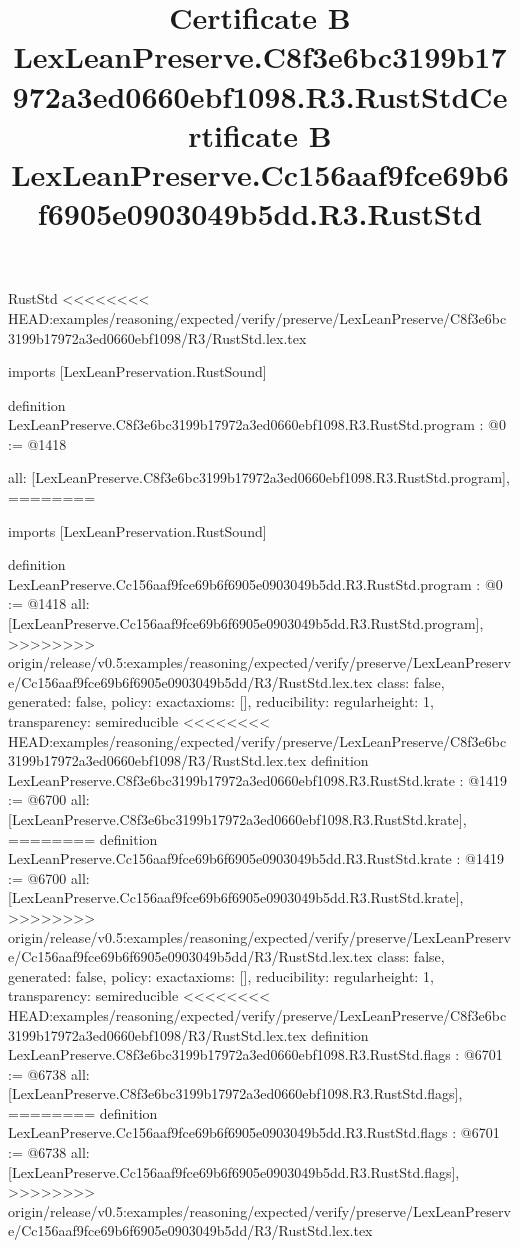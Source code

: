\begin{lexlean}{RustStd}
<<<<<<<< HEAD:examples/reasoning/expected/verify/preserve/LexLeanPreserve/C8f3e6bc3199b17972a3ed0660ebf1098/R3/RustStd.lex.tex
\title{Certificate B LexLeanPreserve.C8f3e6bc3199b17972a3ed0660ebf1098.R3.RustStd}
\begin{coremodule}
imports [LexLeanPreservation.RustSound]

definition LexLeanPreserve.C8f3e6bc3199b17972a3ed0660ebf1098.R3.RustStd.program : @0 := @1418 {
  all: [LexLeanPreserve.C8f3e6bc3199b17972a3ed0660ebf1098.R3.RustStd.program],
========
\title{Certificate B LexLeanPreserve.Cc156aaf9fce69b6f6905e0903049b5dd.R3.RustStd}
\begin{coremodule}
imports [LexLeanPreservation.RustSound]

definition LexLeanPreserve.Cc156aaf9fce69b6f6905e0903049b5dd.R3.RustStd.program : @0 := @1418 {
  all: [LexLeanPreserve.Cc156aaf9fce69b6f6905e0903049b5dd.R3.RustStd.program],
>>>>>>>> origin/release/v0.5:examples/reasoning/expected/verify/preserve/LexLeanPreserve/Cc156aaf9fce69b6f6905e0903049b5dd/R3/RustStd.lex.tex
  class: false,
  generated: false,
  policy: exact{axioms: []},
  reducibility: regular{height: 1},
  transparency: semireducible
}
<<<<<<<< HEAD:examples/reasoning/expected/verify/preserve/LexLeanPreserve/C8f3e6bc3199b17972a3ed0660ebf1098/R3/RustStd.lex.tex
definition LexLeanPreserve.C8f3e6bc3199b17972a3ed0660ebf1098.R3.RustStd.krate : @1419 := @6700 {
  all: [LexLeanPreserve.C8f3e6bc3199b17972a3ed0660ebf1098.R3.RustStd.krate],
========
definition LexLeanPreserve.Cc156aaf9fce69b6f6905e0903049b5dd.R3.RustStd.krate : @1419 := @6700 {
  all: [LexLeanPreserve.Cc156aaf9fce69b6f6905e0903049b5dd.R3.RustStd.krate],
>>>>>>>> origin/release/v0.5:examples/reasoning/expected/verify/preserve/LexLeanPreserve/Cc156aaf9fce69b6f6905e0903049b5dd/R3/RustStd.lex.tex
  class: false,
  generated: false,
  policy: exact{axioms: []},
  reducibility: regular{height: 1},
  transparency: semireducible
}
<<<<<<<< HEAD:examples/reasoning/expected/verify/preserve/LexLeanPreserve/C8f3e6bc3199b17972a3ed0660ebf1098/R3/RustStd.lex.tex
definition LexLeanPreserve.C8f3e6bc3199b17972a3ed0660ebf1098.R3.RustStd.flags : @6701 := @6738 {
  all: [LexLeanPreserve.C8f3e6bc3199b17972a3ed0660ebf1098.R3.RustStd.flags],
========
definition LexLeanPreserve.Cc156aaf9fce69b6f6905e0903049b5dd.R3.RustStd.flags : @6701 := @6738 {
  all: [LexLeanPreserve.Cc156aaf9fce69b6f6905e0903049b5dd.R3.RustStd.flags],
>>>>>>>> origin/release/v0.5:examples/reasoning/expected/verify/preserve/LexLeanPreserve/Cc156aaf9fce69b6f6905e0903049b5dd/R3/RustStd.lex.tex
}}}
\end{coremodule}}
\end{coremodule}
\end{lexlean}
